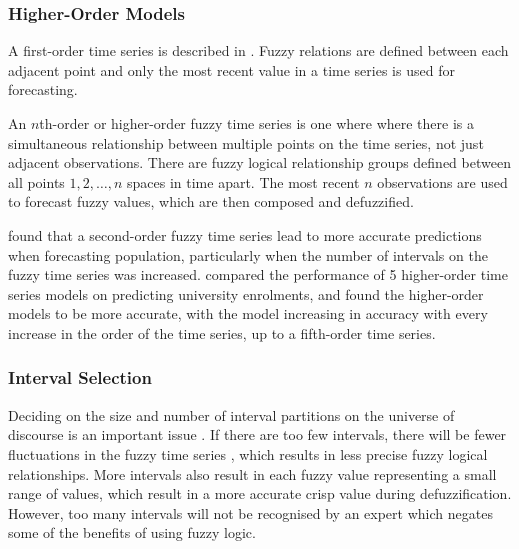 \documentclass{article}
\theoremstyle{definition}
\begin{document}
\subsubsection{Higher-Order Models}

\label{higher}

A first-order time series is described in . Fuzzy relations are defined between each adjacent point and only the most recent value in a time series is used for forecasting.

An $n$th-order or higher-order fuzzy time series is one where where there is a simultaneous relationship between multiple points on the time series, not just adjacent observations. There are fuzzy logical relationship groups defined between all points $1,2,\ldots,n$ spaces in time apart. The most recent $n$ observations are used to forecast fuzzy values, which are then composed and defuzzified.

\cite{tsai1999study} found that a second-order fuzzy time series lead to more accurate predictions when forecasting population, particularly when the number of intervals on the fuzzy time series was increased. \cite{tsai2000forecasting} compared the performance of 5 higher-order time series models on predicting university enrolments, and found the higher-order models to be more accurate, with the model increasing in accuracy with every increase in the order of the time series, up to a fifth-order time series.

\subsubsection{Interval Selection}

\label{interval}

Deciding on the size and number of interval partitions on the universe of discourse is an important issue \citep{Huarng2001effective,  huarng2006ratio}. If there are too few intervals, there will be fewer fluctuations in the fuzzy time series \citep{Huarng2001effective}, which results in less precise fuzzy logical relationships. More intervals also result in each fuzzy value representing a small range of values, which result in a more accurate crisp value during defuzzification. However, too many intervals will not be recognised by an expert which negates some of the benefits of using fuzzy logic.
\end{document}
